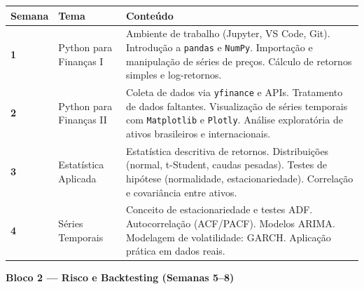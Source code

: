 \documentclass[12pt,a4paper]{article}
\begin{document}
\vspace{0.3cm}
\renewcommand{\arraystretch}{1.5}
\begin{tabularx}{\textwidth}{C{1.8cm} L{3.5cm} X}
    \toprule
    \textbf{Semana} & \textbf{Tema} & \textbf{Conteúdo} \\
    \midrule
    
    \textbf{1} & Python para Finanças I &
    Ambiente de trabalho (Jupyter, VS Code, Git). Introdução a \texttt{pandas} e \texttt{NumPy}. Importação e manipulação de séries de preços. Cálculo de retornos simples e log-retornos. \\
    
    \textbf{2} & Python para Finanças II &
    Coleta de dados via \texttt{yfinance} e APIs. Tratamento de dados faltantes. Visualização de séries temporais com \texttt{Matplotlib} e \texttt{Plotly}. Análise exploratória de ativos brasileiros e internacionais. \\
    
    \textbf{3} & Estatística Aplicada &
    Estatística descritiva de retornos. Distribuições (normal, t-Student, caudas pesadas). Testes de hipótese (normalidade, estacionariedade). Correlação e covariância entre ativos. \\
    
    \textbf{4} & Séries Temporais &
    Conceito de estacionariedade e testes ADF. Autocorrelação (ACF/PACF). Modelos ARIMA. Modelagem de volatilidade: GARCH. Aplicação prática em dados reais. \\
    
    \bottomrule
\end{tabularx}

\vspace{0.8cm}

\noindent
\textbf{\textcolor{ufuazul}{ Bloco 2 — Risco e Backtesting (Semanas 5--8)}}
\end{document}
